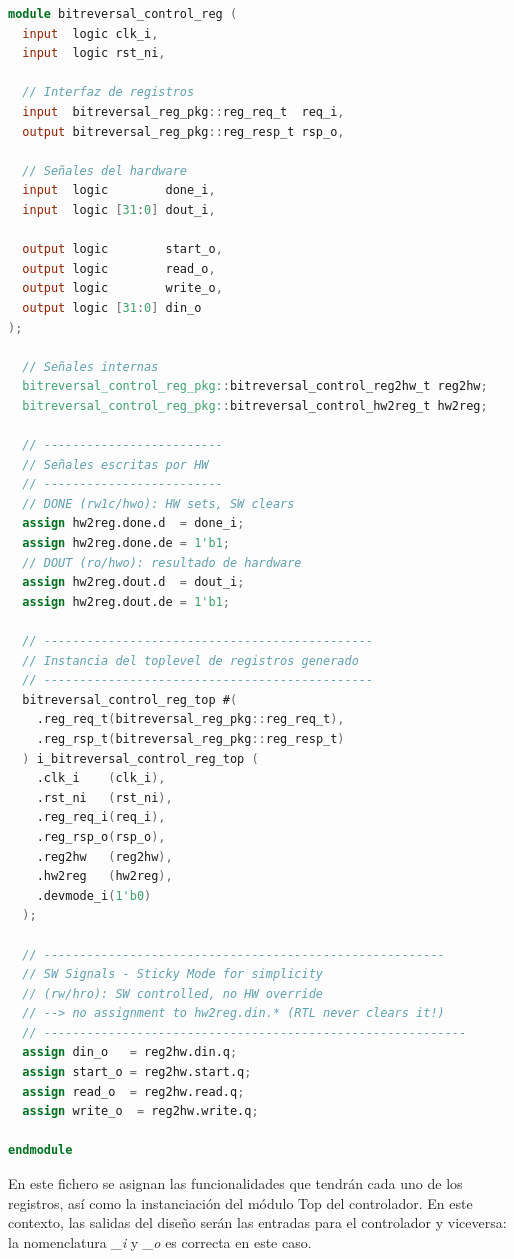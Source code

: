 \begin{lstlisting}[language=verilog,frame=single,caption={Código fuente del testbench},showstringspaces=false,label=lst:wrapperControladorRegistros]
module bitreversal_control_reg (
  input  logic clk_i,
  input  logic rst_ni,

  // Interfaz de registros
  input  bitreversal_reg_pkg::reg_req_t  req_i,
  output bitreversal_reg_pkg::reg_resp_t rsp_o,

  // Señales del hardware
  input  logic        done_i,
  input  logic [31:0] dout_i,

  output logic        start_o,
  output logic        read_o,
  output logic        write_o,
  output logic [31:0] din_o
);

  // Señales internas
  bitreversal_control_reg_pkg::bitreversal_control_reg2hw_t reg2hw;
  bitreversal_control_reg_pkg::bitreversal_control_hw2reg_t hw2reg;

  // -------------------------
  // Señales escritas por HW
  // -------------------------
  // DONE (rw1c/hwo): HW sets, SW clears
  assign hw2reg.done.d  = done_i;
  assign hw2reg.done.de = 1'b1;
  // DOUT (ro/hwo): resultado de hardware
  assign hw2reg.dout.d  = dout_i;
  assign hw2reg.dout.de = 1'b1;

  // ----------------------------------------------
  // Instancia del toplevel de registros generado
  // ----------------------------------------------
  bitreversal_control_reg_top #(
    .reg_req_t(bitreversal_reg_pkg::reg_req_t),
    .reg_rsp_t(bitreversal_reg_pkg::reg_resp_t)
  ) i_bitreversal_control_reg_top (
    .clk_i    (clk_i),
    .rst_ni   (rst_ni),
    .reg_req_i(req_i),
    .reg_rsp_o(rsp_o),
    .reg2hw   (reg2hw),
    .hw2reg   (hw2reg),
    .devmode_i(1'b0)
  );

  // --------------------------------------------------------
  // SW Signals - Sticky Mode for simplicity
  // (rw/hro): SW controlled, no HW override
  // --> no assignment to hw2reg.din.* (RTL never clears it!)
  // -----------------------------------------------------------
  assign din_o   = reg2hw.din.q;
  assign start_o = reg2hw.start.q;
  assign read_o  = reg2hw.read.q;
  assign write_o  = reg2hw.write.q;

endmodule
\end{lstlisting}

En este fichero se asignan las funcionalidades que tendrán cada uno de los registros, así como la instanciación del módulo Top del controlador. En este contexto, las salidas del diseño serán las entradas para el controlador y viceversa: la nomenclatura \emph{\_i} y \emph{\_o} es correcta en este caso.

